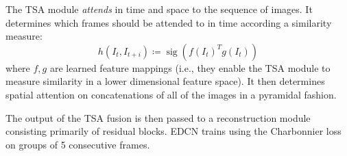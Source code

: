 The TSA module \textit{attends} in time and space to the sequence of images.
%
It determines which frames should be attended to in time according a similarity measure:
\begin{equation}
    h(I_t, I_{t+i}) \coloneqq \operatorname{sig} \left(f(I_t)^T g(I_t)\right)
\end{equation}
where \(f,g\) are learned feature mappings (i.e., they enable the TSA module to measure similarity in a lower dimensional feature space).
%
It then determines spatial attention on concatenations of all of the images in a pyramidal fashion.

The output of the TSA fusion is then passed to a reconstruction module consisting primarily of residual blocks.
%
EDCN trains using the Charbonnier loss on groups of 5 consecutive frames. 